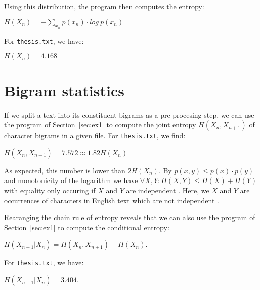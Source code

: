 \documentclass[10pt,a4paper,oneside,onecolumn]{article}
\newcommand*{\thesisTXT}{{\tt thesis.txt}\xspace}
\begin{document}
Using this distribution\footnotemark, the program then computes the entropy:

\begin{center}
    $H(X_n) = -\sum\limits_{x_n} p(x_n) \cdot log~p(x_n)$
\end{center}

For \thesisTXT, we have:

\begin{center}
    $H(X_n) = 4.168$\footnotemark
\end{center}

\section{Bigram statistics}\label{sec:ex2}

If we split a text into its constituent bigrams as a pre-procesing step, we can
use the program of Section~\ref{sec:ex1} to compute the joint entropy $H(X_n,
X_{n+1})$ of character bigrams in a given file. For \thesisTXT, we find:

\begin{center}
    $H(X_n, X_{n+1}) = 7.572 \approx 1.82H(X_n)$\footnotemark
\end{center}

As expected, this number is lower than $2H(X_n)$. By $p(x,y) \le p(x) \cdot
p(y)$ and monotonicity of the logarithm we have $\forall X,Y: H(X, Y) \le H(X) +
H(Y)$ with equality only occuring if $X$ and $Y$ are independent
\cite[p.~138]{mackay}. Here, we $X$ and $Y$ are occurrences of characters in
English text which are not independent \cite[p.~22-24]{mackay}.

Rearanging the chain rule of entropy \cite[p.~139]{mackay} reveals that we can
also use the program of Section~\ref{sec:ex1} to compute the conditional
entropy:

\begin{center}
    $H(X_{n+1} | X_n) = H(X_n, X_{n+1}) - H(X_n)$.
\end{center}

For \thesisTXT, we have:

\begin{center}
    $H(X_{n+1} | X_n) = 3.404$.
\end{center}
\end{document}
